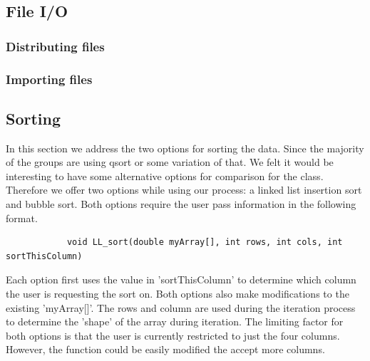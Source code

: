 \documentclass{article}
\begin{document}
\subsection{File I/O}




\subsubsection{Distributing files}



\subsubsection{Importing files}




\subsection{Sorting}
In this section we address the two options for sorting the data. Since the majority of the groups are using qsort or some variation of that. We felt it would be interesting to have some alternative options for comparison for the class. Therefore we offer two options while using our process: a linked list insertion sort and bubble sort. Both options require the user pass information in the following format. 
\begin{lstlisting}
            void LL_sort(double myArray[], int rows, int cols, int sortThisColumn)
\end{lstlisting}
Each option first uses the value in 'sortThisColumn' to determine which column the user is requesting the sort on. Both options also make modifications to the existing 'myArray[]'. The rows and column are used during the iteration process to determine the 'shape' of the array during iteration. The limiting factor for both options is that the user is currently restricted to just the four columns. However, the function could be easily modified the accept more columns.
\end{document}
